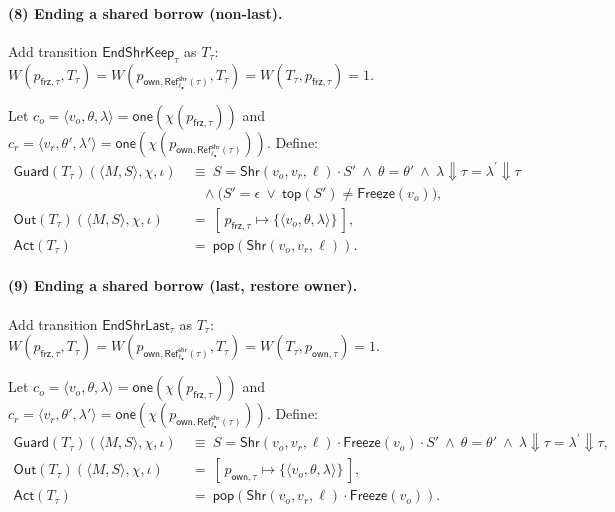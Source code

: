 \documentclass[runningheads]{llncs}
\newcommand{\LamCut}[2]{#1\Downarrow #2}
\begin{document}
\paragraph{(8) Ending a shared borrow (non-last).}
Add transition $\mathsf{EndShrKeep}_\tau$ as $T_\tau$: \\
$W(p_{\mathsf{frz},\tau},T_\tau)=W(p_{\mathsf{own},\mathsf{Ref}^{\mathsf{shr}}_{\ell_{\bullet}}(\tau)},T_\tau)=
W(T_\tau,p_{\mathsf{frz},\tau})=1.$

Let $c_o=\langle v_o,\theta,\lambda\rangle=\mathsf{one}(\chi(p_{\mathsf{frz},\tau}))$ and
$c_r=\langle v_r,\theta',\lambda'\rangle=\mathsf{one}(\chi(p_{\mathsf{own},\mathsf{Ref}^{\mathsf{shr}}_{\ell_{\bullet}}(\tau)}))$.
Define:
\begin{align*}
\mathsf{Guard}(T_\tau)(\langle M,S\rangle,\chi,\iota)
&~\equiv~ S=\mathsf{Shr}(v_o,v_r,\ell)\cdot S'
\ \wedge\ \theta=\theta'
\ \wedge\ \LamCut{\lambda}{\tau}=\LamCut{\lambda^{\prime}}{\tau} \\ 
&\quad \wedge \big(S'=\epsilon\ \vee\ \mathsf{top}(S')\neq \mathsf{Freeze}(v_o)\big),\\
\mathsf{Out}(T_\tau)(\langle M,S\rangle,\chi,\iota)
&~=~ [\,p_{\mathsf{frz},\tau}\mapsto \{\langle v_o,\theta,\lambda\rangle\}\,],\\
\mathsf{Act}(T_\tau)
&~=~ \mathsf{pop}(\mathsf{Shr}(v_o,v_r,\ell)).
\end{align*}

\paragraph{(9) Ending a shared borrow (last, restore owner).}
Add transition $\mathsf{EndShrLast}_\tau$ as $T_\tau$: \\
$W(p_{\mathsf{frz},\tau},T_\tau)=W(p_{\mathsf{own},\mathsf{Ref}^{\mathsf{shr}}_{\ell_{\bullet}}(\tau)},T_\tau)=
W(T_\tau,p_{\mathsf{own},\tau})=1.$

Let $c_o=\langle v_o,\theta,\lambda\rangle=\mathsf{one}(\chi(p_{\mathsf{frz},\tau}))$ and
$c_r=\langle v_r,\theta',\lambda'\rangle=\mathsf{one}(\chi(p_{\mathsf{own},\mathsf{Ref}^{\mathsf{shr}}_{\ell_{\bullet}}(\tau)}))$.
Define:
\begin{align*}
\mathsf{Guard}(T_\tau)(\langle M,S\rangle,\chi,\iota)
&~\equiv~ S=\mathsf{Shr}(v_o,v_r,\ell)\cdot \mathsf{Freeze}(v_o)\cdot S'
\ \wedge\ \theta=\theta'
\ \wedge\ \LamCut{\lambda}{\tau}=\LamCut{\lambda^{\prime}}{\tau},\\
\mathsf{Out}(T_\tau)(\langle M,S\rangle,\chi,\iota)
&~=~ [\,p_{\mathsf{own},\tau}\mapsto \{\langle v_o,\theta,\lambda\rangle\}\,],\\
\mathsf{Act}(T_\tau)
&~=~ \mathsf{pop}(\mathsf{Shr}(v_o,v_r,\ell)\cdot \mathsf{Freeze}(v_o)).
\end{align*}
\end{document}
